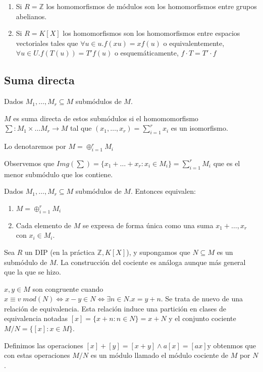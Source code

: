 \begin{example}
\begin{enumerate}
\item Si $R = \mathbb{Z}$ los homomorfismos de módulos son los homomorfismos entre grupos abelianos.

\item Si $R = K[X]$ los homomorfismos son los homomorfismos entre espacios vectoriales tales que $ \forall u \in u. f(xu) = xf(u)$ o equivalentemente, $\forall u \in U. f(T(u)) = T'f(u)$ o esquemáticamente, $f \cdot T = T' \cdot f$
\end{enumerate}
\end{example}

\subsection{Suma directa}

\begin{definition}
Dados $M_1,\ldots,M_r \subseteq M$ submódulos de $M$. 

$M$ es suma directa de estos submódulos si el homomomorfismo $\sum: M_1 \times \ldots M_r \to M$ tal que $(x_1,\ldots,x_r) = \sum_{i = 1}^r x_i$ es un isomorfismo. 

Lo denotaremos por $M = \oplus_{i = 1}^r M_i$
\end{definition}

Observemos que $Img(\sum) = \{x_1+\ldots+x_r:x_i \in M_i \} = \sum_{i = 1}^r M_i$ que es el menor submódulo que los contiene. 

\begin{proposition}
Dados $M_1,\ldots,M_r \subseteq M$ submódulos de $M$. Entonces equivalen:

\begin{enumerate}
\item $M = \oplus_{i = 1}^r M_i$
\item Cada elemento de $M$ se expresa de forma única como una suma $x_1 + \ldots, x_r$ con $x_i \in M_i$. 
\end{enumerate}
\end{proposition}

\begin{definition}
Sea $R$ un DIP (en la práctica $\mathbb{Z},K[X]$), y supongamos que $N \subseteq M$ es un submódulo de $M$. La construcción del cociente es análoga aunque más general que la que se hizo. 

$x,y \in M$ son congruente cuando $x \equiv v \; mod(N) \iff x-y \in N \iff \exists n \in N. x = y + n$. Se trata de nuevo de una relación de equivalencia. Esta relación induce una partición en clases de equivalencia notadas $[x] = \{x+n: n \in N \} = x + N$ y el conjunto cociente $M/N = \{[x]: x \in M \}$. 

Definimos las operaciones $[x]+[y] = [x+y] \land a[x] = [ax]$y obtenmos que con estas operaciones $M/N$ es un módulo llamado el módulo cociente de $M$ por $N$.  
\end{definition}

